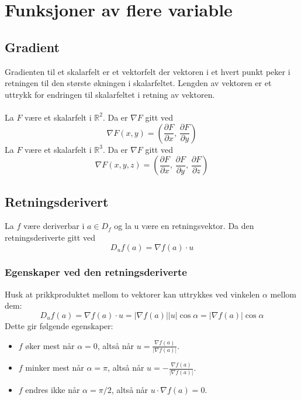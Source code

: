 \documentclass{article}
\begin{document}
\clearpage


\section{Funksjoner av flere variable}


\subsection{Gradient}
Gradienten til et skalarfelt er et vektorfelt der vektoren i et hvert punkt peker i retningen til den største økningen i skalarfeltet. Lengden av vektoren er et uttrykk for endringen til skalarfeltet i retning av vektoren.\\\\
La $F$ være et skalarfelt i $\mathbb{R}^2$. Da er $\nabla F$ gitt ved
\[\nabla F(x,y) = \left(\frac{\partial F}{\partial x},\,\frac{\partial F}{\partial y} \right)\]
La $F$ være et skalarfelt i $\mathbb{R}^3$. Da er $\nabla F$ gitt ved
\[\nabla F(x,y,z) = \left(\frac{\partial F}{\partial x},\,\frac{\partial F}{\partial y},\,\frac{\partial F}{\partial z} \right)\]


\subsection{Retningsderivert}
La $f$ være deriverbar i  $a \in D_f$ og la u være en retningsvektor. Da den retningsderiverte gitt ved
\[D_{u} f(a) = \nabla f(a) \cdot u\]

\subsubsection{Egenskaper ved den retningsderiverte}
Husk at prikkproduktet mellom to vektorer kan uttrykkes ved vinkelen $\alpha$ mellom dem:
\[D_{u} f(a) = \nabla f(a) \cdot u = \left| \nabla f(a) \right| \left| u \right| \cos{\alpha} = \left| \nabla f(a) \right| \cos{\alpha}\]
Dette gir følgende egenskaper:
\begin{itemize}
    \item $f$ øker mest når $\alpha = 0$, altså når $u = \frac{\nabla f(a)}{\left| \nabla f(a) \right|}$.
    \item $f$ minker mest når $\alpha = \pi$, altså når $u = - \frac{\nabla f(a)}{\left| \nabla f(a) \right|}$.
    \item $f$ endres ikke når $\alpha = \pi / 2$, altså når $u \cdot \nabla f(a) = 0$.
\end{itemize}
\end{document}
